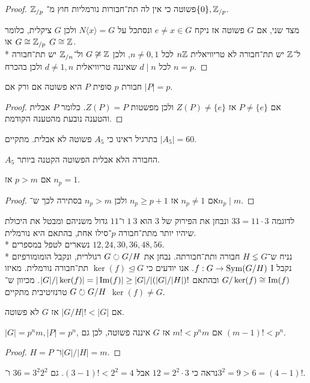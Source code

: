 \begin{proof}
	$\mathbb{Z}_{/p}$ פשוטה כי אין לה תת־חבורות נורמליות חוץ מ־$\{ 0 \}, \mathbb{Z}_{/p}$.

	מצד שני, אם $G$ פשוטה אז ניקח $e \ne x \in G$ ונסתכל על $N \langle x \rangle = G$ ולכן $G$ ציקלית, כלומר $G \cong \mathbb{Z}_{/p}$ או $G \cong \mathbb{Z}$. \\*
	ל־$\mathbb{Z}$ יש תת־חבורה לא טריוויאלית $n \mathbb{Z}$ לכל $n \ne 0, 1$, ולכן $G \not\cong \mathbb{Z}$ ול־$\mathbb{Z}_{/n}$ יש תת־חבורה לכל $d \mid n$ שאיננה טריוויאלית $d \ne 1, n$ ולכן בהכרח $n = p$.
\end{proof}
\begin{proposition}
	חבורת $p$ סופית $P$ היא פשוטה אם ורק אם $|P| = p$.
\end{proposition}
\begin{proof}
	אם $P \ne \{ e \}$ אז $Z(P) \ne \{ e \}$ ולכן מפשטות $Z(P) = P$. כלומר $P$ אבלית והטענה נובעת מהטענה הקודמת.
\end{proof}
בתרגיל ראינו כי $A_5$ פשוטה לא אבלית.
מתקיים $|A_5| = 60$.
\begin{proposition}
	$A_5$ החבורה הלא אבלית הפשוטה הקטנה ביותר.
\end{proposition}
\begin{proposition}
	אם $p > m$ אז $n_p = 1$.
\end{proposition}
\begin{proof}
	אם $n_p \ne 1$ אז $n_p \ge p + 1$ ולכן $n_p > m$ בסתירה לכך ש־$n_p \mid m$.
\end{proof}
לדוגמה $33 = 11 \cdot 3$ ונבחן את הפירוק של $3$ הוא $1\ 3$ ו־$11$ גדול משניהם ומבטל את היכולת שיהיו יותר מתת־חבורה $p$־סילו אחת, בהתאם היא נורמלית. \\*
נשארים לטפל במספרים $12, 24, 30, 36, 48, 56$. \\*
נניח ש־$H \lneq G$ חבורה ותת־חבורתה. נבחן את $G \circlearrowright G / H$ רגולרית, ונקבל הומומורפיזם $f : G \to \operatorname{Sym}(G/H)$.
אנו יודעים כי $\ker(f) \trianglelefteq G$ תת־חבורה נורמלית.
מאיזו I נקבל $G / \ker(f) \cong \operatorname{Im}(f)$ ובהתאם $|G| / |\ker(f)| = |\operatorname{Im}(f)| \ge |G|/|(|G|/|H|)! $.
מכיוון ש־$G \circlearrowright G/H$ טרנזיטיבית מתקיים $\ker(f) \ne G$.
\begin{conclusion}
	אם $|G/H|! < |G|$ אז $G$ לא פשוטה.
\end{conclusion}
\begin{proposition}
	$|G| = p^n m, |P| = p^n$, אם $m! < p^n m$ אז $G$ איננה פשוטה, לכן גם $(m - 1)! < p^n$.
\end{proposition}
\begin{proof}
	$H = P$ ו־$|G|/|H| = m$.
\end{proof}
נראה כי $12 = 2^2 \cdot 3$ אבל $(3 - 1)! < 2^2 = 4$.
גם $36 = 3^2 2^2$ ו־$3^2 = 9 > 6 = (4 - 1)! $.

